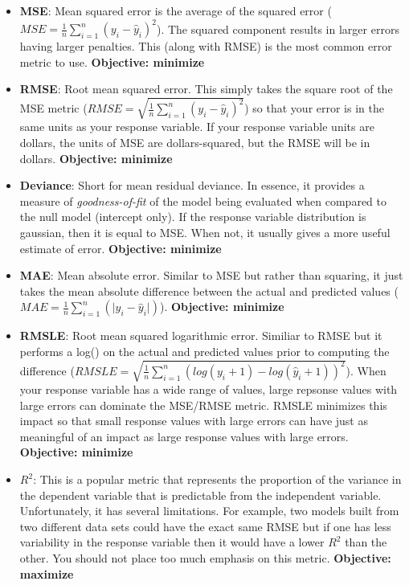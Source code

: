 \documentclass[]{book}
\theoremstyle{definition}
\theoremstyle{definition}
\theoremstyle{definition}
\theoremstyle{remark}
\begin{document}
\begin{itemize}
\item
  \textbf{MSE}: Mean squared error is the average of the squared error
  (\(MSE = \frac{1}{n} \sum^n_{i=1}(y_i - \hat y_i)^2\)). The squared
  component results in larger errors having larger penalties. This
  (along with RMSE) is the most common error metric to use.
  \textbf{Objective: minimize}
\item
  \textbf{RMSE}: Root mean squared error. This simply takes the square
  root of the MSE metric
  (\(RMSE = \sqrt{\frac{1}{n} \sum^n_{i=1}(y_i - \hat y_i)^2}\)) so that
  your error is in the same units as your response variable. If your
  response variable units are dollars, the units of MSE are
  dollars-squared, but the RMSE will be in dollars. \textbf{Objective:
  minimize}
\item
  \textbf{Deviance}: Short for mean residual deviance. In essence, it
  provides a measure of \emph{goodness-of-fit} of the model being
  evaluated when compared to the null model (intercept only). If the
  response variable distribution is gaussian, then it is equal to MSE.
  When not, it usually gives a more useful estimate of error.
  \textbf{Objective: minimize}
\item
  \textbf{MAE}: Mean absolute error. Similar to MSE but rather than
  squaring, it just takes the mean absolute difference between the
  actual and predicted values
  (\(MAE = \frac{1}{n} \sum^n_{i=1}(\vert y_i - \hat y_i \vert)\)).
  \textbf{Objective: minimize}
\item
  \textbf{RMSLE}: Root mean squared logarithmic error. Similiar to RMSE
  but it performs a log() on the actual and predicted values prior to
  computing the difference
  (\(RMSLE = \sqrt{\frac{1}{n} \sum^n_{i=1}(log(y_i + 1) - log(\hat y_i + 1))^2}\)).
  When your response variable has a wide range of values, large repsonse
  values with large errors can dominate the MSE/RMSE metric. RMSLE
  minimizes this impact so that small response values with large errors
  can have just as meaningful of an impact as large response values with
  large errors. \textbf{Objective: minimize}
\item
  \textbf{\(R^2\)}: This is a popular metric that represents the
  proportion of the variance in the dependent variable that is
  predictable from the independent variable. Unfortunately, it has
  several limitations. For example, two models built from two different
  data sets could have the exact same RMSE but if one has less
  variability in the response variable then it would have a lower
  \(R^2\) than the other. You should not place too much emphasis on this
  metric. \textbf{Objective: maximize}
\end{itemize}
\end{document}
